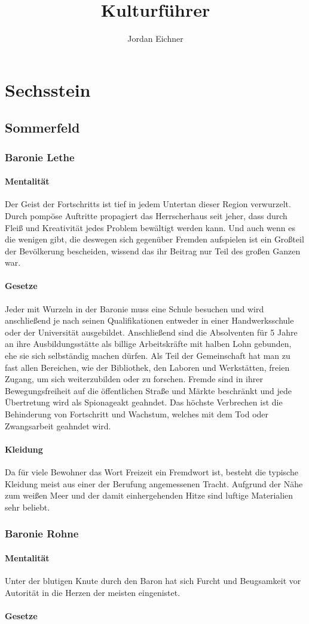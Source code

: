 \documentclass[a4paper,12pt,oneside]{book}
\title{Kulturführer}
\author{Jordan Eichner}
\date{}
\begin{document}
\maketitle
\tableofcontents

\part{Sechsstein}

\chapter{Sommerfeld}
\section{Baronie Lethe}
\subsection{Mentalität}
Der Geist der Fortschritts ist tief in jedem Untertan dieser Region verwurzelt. Durch pompöse Auftritte propagiert das Herrscherhaus seit jeher, dass durch Fleiß und Kreativität jedes Problem bewältigt werden kann. Und auch wenn es die wenigen gibt, die deswegen sich gegenüber Fremden aufspielen ist ein Großteil der Bevölkerung bescheiden, wissend das ihr Beitrag nur Teil des großen Ganzen war.
\subsection{Gesetze}
Jeder mit Wurzeln in der Baronie muss eine Schule besuchen und wird anschließend je nach seinen Qualifikationen entweder in einer Handwerksschule oder der Universität ausgebildet. Anschließend sind die Absolventen für 5 Jahre an ihre Ausbildungsstätte als billige Arbeitskräfte mit halben Lohn gebunden, ehe sie sich selbständig machen dürfen. Als Teil der Gemeinschaft hat man zu fast allen Bereichen, wie der Bibliothek, den Laboren und Werkstätten, freien Zugang, um sich weiterzubilden oder zu forschen. Fremde sind in ihrer Bewegungsfreiheit auf die öffentlichen Straße und Märkte beschränkt und jede Übertretung wird als Spionageakt geahndet. Das höchste Verbrechen ist die Behinderung von Fortschritt und Wachstum, welches mit dem Tod oder Zwangsarbeit geahndet wird.
\subsection{Kleidung}
 Da für viele Bewohner das Wort Freizeit ein Fremdwort ist, besteht die typische Kleidung meist aus einer der Berufung angemessenen Tracht. Aufgrund der Nähe zum weißen Meer und der damit einhergehenden Hitze sind luftige Materialien sehr beliebt.
 
\section{Baronie Rohne}
\subsection{Mentalität}
Unter der blutigen Knute durch den Baron hat sich Furcht und Beugsamkeit vor Autorität in die Herzen der meisten eingenistet.  
\subsection{Gesetze}
 
\end{document}
